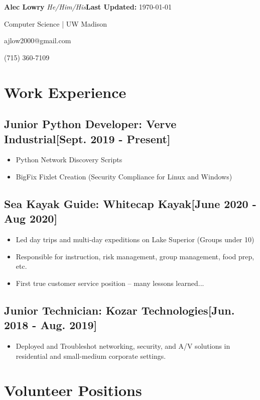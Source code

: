 \documentclass{article}
\begin{document}
\textbf{Alec Lowry} \emph{He/Him/His}\hfill{\textbf{Last Updated:} \today}

Computer Science | UW Madison

ajlow2000@gmail.com

(715) 360-7109

\section{ Work Experience}

    \subsection{\textbf{Junior Python Developer}: Verve Industrial\hfill[Sept. 2019 - Present]}
        \begin{itemize}
            \item Python Network Discovery Scripts
            \item BigFix Fixlet Creation (Security Compliance for Linux and Windows)
        \end{itemize}

    \subsection{\textbf{Sea Kayak Guide}: Whitecap Kayak\hfill[June 2020 - Aug 2020]}
        \begin{itemize}
            \item Led day trips and multi-day expeditions on Lake Superior (Groups under 10)
            \item Responsible for instruction, risk management, group management, food prep, etc.
            \item First true customer service position -- many lessons learned...
        \end{itemize}

    \subsection{\textbf{Junior Technician}: Kozar Technologies\hfill[Jun. 2018 - Aug. 2019]}
        \begin{itemize}
            \item Deployed and Troubleshot networking, security, and A/V solutions in residential and small-medium corporate settings.
        \end{itemize}

\section{Volunteer Positions}
\end{document}
